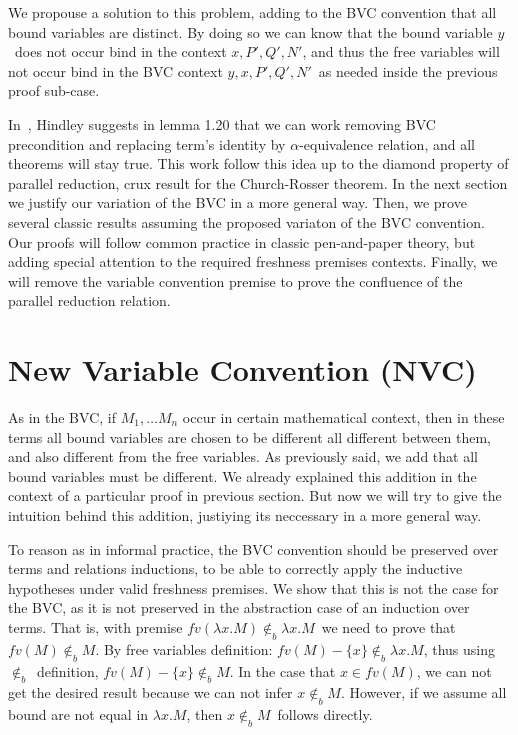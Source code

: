 \documentclass{article}
\newcommand{\alp}{\ensuremath{\alpha}}
\newcommand{\ninb}{\ensuremath{\not\in_b}}
\newcommand{\lam}{\ensuremath{\lambda}}
\begin{document}
We propouse a solution to this problem, adding to the BVC convention that all bound variables are distinct. By doing so we can know that the bound variable $y$\ does not occur bind in the context $x,P',Q',N'$, and thus the free variables will not occur bind in the BVC context $y,x,P',Q',N'$\ as needed inside the previous proof sub-case.

In~\cite{hindley:2008}, Hindley suggests in lemma 1.20 that we can work removing BVC precondition and replacing term's identity by \alp-equivalence relation, and all theorems will stay true. This work follow this idea up to the diamond property of parallel reduction, crux result for the Church-Rosser theorem. In the next section we justify our variation of the BVC in a more general way. Then, we prove several classic results assuming the proposed variaton of the BVC convention. Our proofs will follow common practice in classic pen-and-paper theory, but adding special attention to the required freshness premises contexts. Finally, we will remove the variable convention premise to prove the confluence of the parallel reduction relation.

\section{New Variable Convention (NVC)}

As in the BVC, if $M_1, \dots M_n$ occur in certain mathematical context, then in these terms all bound variables are chosen to be different all different between them, and also different from the free variables. As previously said, we add that all bound variables must be different. We already explained this addition in the context of a particular proof in previous section. But now we will try to give the intuition behind this addition, justiying its neccessary in a more general way.

To reason as in informal practice, the BVC convention should be preserved over terms and relations inductions, to be able to correctly apply the inductive hypotheses under valid freshness premises. We show that this is not the case for the BVC, as it is not preserved in the abstraction case of an induction over terms. That is, with premise $fv (\lam x. M) \ninb \lam x .M$\ we need to prove that $fv(M) \ninb M$. By free variables definition: $fv (M) - \{ x \}  \ninb \lam x .M$, thus using $\ninb$\ definition, $fv (M) - \{ x \}  \ninb M$. In the case that $x \in fv(M)$, we can not get the desired result because we can not infer $x \ninb M$. However, if we assume all bound are not equal in $\lam x . M$, then $x \ninb M$\ follows directly.
\end{document}
